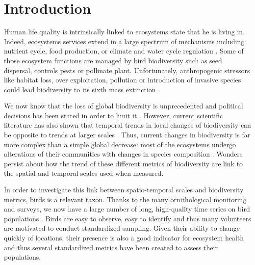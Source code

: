 \documentclass[
  12pt,
  oneside]{report}
\author{François Leroy, PhD student at CZU}
\date{2021-09-21}
\begin{document}


\cleardoublepage 
{}

{
\hypersetup{linkcolor=}
\setcounter{tocdepth}{1}
\tableofcontents
\newpage
}
\vspace{50mm}


\cleardoublepage 
{}


\hypertarget{introduction}{%
\chapter{Introduction}\label{introduction}}

Human life quality is intrinsically linked to ecosystems state that he is living in. Indeed, ecosystems services extend in a large spectrum of mechanisms including nutrient cycle, food production, or climate and water cycle regulation \autocite{pereira_global_2012}. Some of those ecosystem functions are managed by bird biodiversity such as seed dispersal, controls pests or pollinate plant. Unfortunately, anthropogenic stressors like habitat loss, over exploitation, pollution or introduction of invasive species could lead biodiversity to its sixth mass extinction \autocite{barnosky_has_2011}.

We now know that the loss of global biodiversity is unprecedented and political decisions has been stated in order to limit it \autocite[\emph{e.g.}][2010, 2002]{secretariat_of_the_convention_on_biological_diversity_global_2006}. However, current scientific literature has also shown that temporal trends in local changes of biodiversity can be opposite to trends at larger scales \autocite[\emph{e.g.}][]{chase_species_2019}. Thus, current changes in biodiversity is far more complex than a simple global decrease: most of the ecosystems undergo alterations of their communities with changes in species composition \autocite{blowes_geography_2019,dornelas_quantifying_2013}. Wonders persist about how the trend of these different metrics of biodiversity are link to the spatial and temporal scales used when measured.

In order to investigate this link between spatio-temporal scales and biodiversity metrics, birds is a relevant taxon. Thanks to the many ornithological monitoring and surveys, we now have a large number of long, high-quality time series on bird populations \autocites{bejcek_velke_2016,sauer_north_2013,kamp_population_2021}. Birds are easy to observe, easy to identify and thus many volunteers are motivated to conduct standardized sampling. Given their ability to change quickly of locations, their presence is also a good indicator for ecosystem health and thus several standardized metrics have been created to assess their populations.
\end{document}
